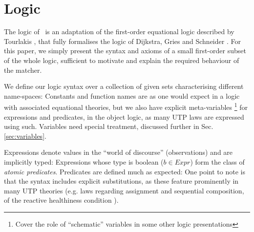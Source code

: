 \section{Logic}\label{sec:logic}

The logic of \ is an adaptation of the first-order equational logic
described by Tourlakis \cite{journals/logcom/Tourlakis01},
that fully formalises the logic of Dijkstra, Gries and Schneider \cite{gries.93}.
For this paper, we simply present the syntax and axioms of
a small first-order subset of
the whole logic,
sufficient to motivate and explain the required behaviour of the matcher.

We define our logic syntax
over a collection of given sets characterising different name-spaces:
Constants and function names are as one would expect
in a logic with associated equational theories,
but we also have explicit meta-variables%
\footnote{Cover the role of ``schematic'' variables in some other logic presentations}
 for expressions
and predicates, in the object logic, as many UTP laws
are expressed using such.
Variables need special treatment, discussed further in Sec. \ref{sec:variables}.

Expressions denote values in the ``world of discourse'' (observations)
and are implicitly typed:
Expressions whose type is boolean ($b \in Expr$)
form the class
of \emph{atomic predicates}.
Predicates are defined much as expected:
One point to note is that the syntax includes explicit substitutions,
as these feature prominently in many UTP theories
(e.g. laws regarding assignment and sequential composition,
of the reactive healthiness condition ).

